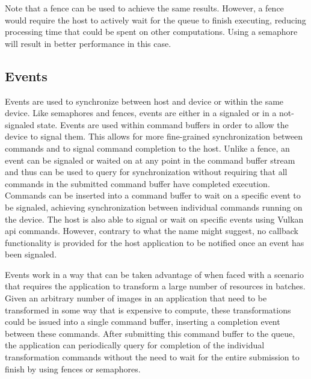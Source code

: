       Note that a fence can be used to achieve the same results.
      However, a fence would require the \gls{host} to actively wait for the queue to finish executing, reducing processing time that could be spent on other computations.
      Using a semaphore will result in better performance in this case.

    \subsection{Events}
    \label{sub:Events}
      Events are used to synchronize between \gls{host} and device or within the same device.
      Like semaphores and fences, events are either in a signaled or in a not-signaled state.
      Events are used within command buffers in order to allow the device to signal them.
      This allows for more fine-grained synchronization between commands and to signal command completion to the \gls{host}.
      Unlike a fence, an event can be signaled or waited on at any point in the command buffer stream and thus can be used to query for synchronization without requiring that all commands in the submitted command buffer have completed execution.
      Commands can be inserted into a command buffer to wait on a specific event to be signaled, achieving synchronization between individual commands running on the device.
      The host is also able to signal or wait on specific events using Vulkan \gls{api} commands.
      However, contrary to what the name might suggest, no callback functionality is provided for the host application to be notified once an event has been signaled.

      Events work in a way that can be taken advantage of when faced with a scenario that requires the \gls{application} to transform a large number of resources in batches.
      Given an arbitrary number of images in an \gls{application} that need to be transformed in some way that is expensive to compute, these transformations could be issued into a single command buffer, inserting a completion event between these commands.
      After submitting this command buffer to the queue, the \gls{application} can periodically query for completion of the individual transformation commands without the need to wait for the entire submission to finish by using fences or semaphores.

